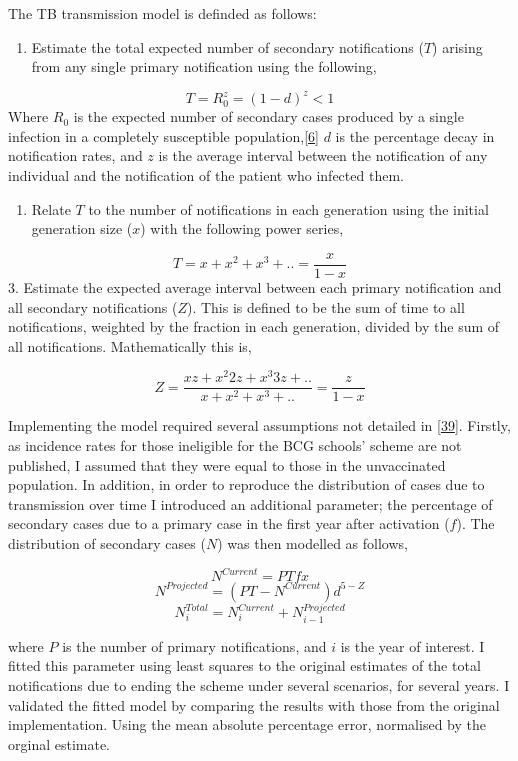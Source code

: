 \documentclass[11pt,twoside]{bristolthesis}
\providecommand{\tightlist}{%
  \setlength{\itemsep}{0pt}\setlength{\parskip}{0pt}}
\begin{document}
  The TB transmission model is definded as follows:
  \begin{enumerate}
  \def\labelenumi{\arabic{enumi}.}
  \tightlist
  \item
    Estimate the total expected number of secondary notifications (\(T\)) arising from any single primary notification using the following,
  \end{enumerate}
  \[ T = R_0^z = (1-d)^z < 1 \]
  Where \(R_0\) is the expected number of secondary cases produced by a single infection in a completely susceptible population,{[}\protect\hyperlink{ref-Anderson1991}{6}{]} \(d\) is the percentage decay in notification rates, and \(z\) is the average interval between the notification of any individual and the notification of the patient who infected them.
  \begin{enumerate}
  \def\labelenumi{\arabic{enumi}.}
  \setcounter{enumi}{1}
  \tightlist
  \item
    Relate \(T\) to the number of notifications in each generation using the initial generation size (\(x\)) with the following power series,
  \end{enumerate}
  \[ T=x+x^2+x^3+ . . = \frac{x}{1-x} \]
  3. Estimate the expected average interval between each primary notification and all secondary notifications (\(Z\)). This is defined to be the sum of time to all notifications, weighted by the fraction in each generation, divided by the sum of all notifications. Mathematically this is,
  
  \[ Z = \frac{xz + x^{2}2z + x^{3}3z + . .}{x+x^2+x^3+ . . }= \frac{z}{1-x} \]
  
  Implementing the model required several assumptions not detailed in {[}\protect\hyperlink{ref-Sutherland1989}{39}{]}. Firstly, as incidence rates for those ineligible for the BCG schools' scheme are not published, I assumed that they were equal to those in the unvaccinated population. In addition, in order to reproduce the distribution of cases due to transmission over time I introduced an additional parameter; the percentage of secondary cases due to a primary case in the first year after activation (\(f\)). The distribution of secondary cases (\(N\)) was then modelled as follows,
  
  \[ N^{Current} = P T  f  x \]
  \[ N^{Projected} = ( PT - N^{Current})d^{5-Z} \]
  \[ N_i^{Total} = N^{Current}_i + N^{Projected}_{i-1} \]
  
  where \(P\) is the number of primary notifications, and \(i\) is the year of interest. I fitted this parameter using least squares to the original estimates of the total notifications due to ending the scheme under several scenarios, for several years. I validated the fitted model by comparing the results with those from the original implementation. Using the mean absolute percentage error, normalised by the orginal estimate.
  
\end{document}
